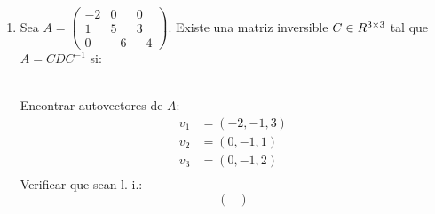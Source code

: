\documentclass[../practica.root.tex]{subfiles}
\begin{document}
\begin{enumerate}
    \item Sea $A = \begin{pmatrix}
                  -2 & 0 & 0 \\ 1 & 5 & 3 \\ 0 & -6 & -4
              \end{pmatrix}$. Existe una matriz inversible $C \in R^{3\times3}$ tal que $A = CDC^{-1}$ si: \\
           \\
          Encontrar autovectores de $A$:
          \begin{align*}
              v_1 & = (-2, -1, 3) \\
              v_2 & = (0, -1, 1)  \\
              v_3 & = (0, -1, 2)  \\
          \end{align*}
          Verificar que sean l. i.:
          \[
              \begin{pmatrix}

\end{pmatrix}\]
\end{enumerate}
\end{document}
